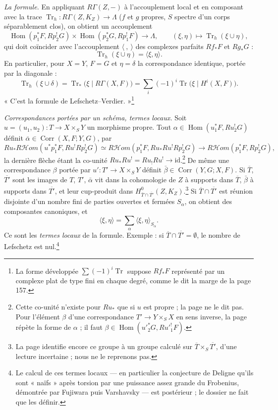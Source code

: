\documentclass[11pt,a4paper]{article}
\begin{document}
\emph{La formule.} En appliquant $R\Gamma(Z, -)$ à l'accouplement local et en
composant avec la trace $\operatorname{Tr}_{h} : R\Gamma(Z, K_{Z}) \to \Lambda$
($f$ et $g$ propres, $S$ spectre d'un corps séparablement clos), on obtient un
accouplement
\[
  \operatorname{Hom}(p_{1}^{*}F, Rp_{2}^{!}G) \times \operatorname{Hom}(p_{2}^{*}G,
  Rp_{1}^{!}F) \to \Lambda, \qquad (\xi, \eta) \mapsto
  \operatorname{Tr}_{h}(\xi \cup \eta),
\]
qui doit coïncider avec l'accouplement $\langle\ ,\ \rangle$ des complexes
parfaits $Rf_{*}F$ et $Rg_{*}G$ :
\[
  \operatorname{Tr}_{h}(\xi \cup \eta) = \langle \xi, \eta\rangle.
\]
En particulier, pour $X = Y$, $F = G$ et $\eta = \delta$ la correspondance
identique, portée par la diagonale :
\[
  \operatorname{Tr}_{h}(\xi \cup \delta) = \operatorname{Tr}_{*}\bigl(\xi \mid
  R\Gamma(X, F)\bigr) = \sum_{i}(-1)^{i}\operatorname{Tr}\bigl(\xi \mid H^{i}(X,
  F)\bigr).
\]
« C'est la formule de Lefschetz--Verdier. »\footnote{La forme développée
$\sum(-1)^{i}\operatorname{Tr}$ suppose $Rf_{*}F$ représenté par un complexe
plat de type fini en chaque degré, comme le dit la marge de la page 157.}

\emph{Correspondances portées par un schéma, termes locaux.} Soit $u = (u_{1},
u_{2}) : T \to X \times_{S} Y$ un morphisme propre. Tout $\alpha \in
\operatorname{Hom}(u_{1}^{*}F, Ru_{2}^{!}G)$ définit $\bar\alpha \in
\operatorname{Corr}(X, F; Y, G)$, par
\[
  Ru_{*}R\mathcal{H}om(u^{*}p_{1}^{*}F, Ru^{!}Rp_{2}^{!}G) \simeq
  R\mathcal{H}om(p_{1}^{*}F, Ru_{*}Ru^{!}Rp_{2}^{!}G) \to
  R\mathcal{H}om(p_{1}^{*}F, Rp_{2}^{!}G),
\]
la dernière flèche étant la co-unité $Ru_{*}Ru^{!} = Ru_{!}Ru^{!} \to
\mathrm{id}$.\footnote{Cette co-unité n'existe pour $Ru_{*}$ que si $u$ est
propre ; la page ne le dit pas. Pour l'élément $\beta$ d'une correspondance $T'
\to Y \times_{S} X$ en sens inverse, la page répète la forme de $\alpha$ ; il
faut $\beta \in \operatorname{Hom}(u'^{*}_{2}G, Ru'^{!}_{1}F)$.} De même une
correspondance $\beta$ portée par $u' : T' \to X \times_{S} Y$ définit $\bar\beta
\in \operatorname{Corr}(Y, G; X, F)$. Si $\overline{T}$, $\overline{T'}$ sont
les images de $T$, $T'$, $\bar\alpha$ vit dans la cohomologie de $Z$ à supports
dans $\overline{T}$, $\bar\beta$ à supports dans $\overline{T'}$, et leur
cup-produit dans $H^{0}_{\overline{T} \cap \overline{T'}}(Z,
K_{Z})$.\footnote{La page identifie encore ce groupe à un groupe calculé sur
$\overline{T} \times_{S} \overline{T'}$, d'une lecture incertaine ; nous ne le
reprenons pas.} Si $\overline{T} \cap \overline{T'}$ est réunion disjointe d'un
nombre fini de parties ouvertes et fermées $S_{\alpha}$, on obtient des
composantes canoniques, et
\[
  \langle \xi, \eta \rangle = \sum_{\alpha} \langle \xi, \eta
  \rangle_{S_{\alpha}} .
\]
Ce sont les \emph{termes locaux} de la formule. Exemple : si $\overline{T}
\cap \overline{T'} = \emptyset$, le nombre de Lefschetz est nul.\footnote{Le
calcul de ces termes locaux --- en particulier la conjecture de Deligne qu'ils
sont « naïfs » après torsion par une puissance assez grande du Frobenius,
démontrée par Fujiwara puis Varshavsky --- est postérieur ; le dossier ne fait
que les définir.}
\end{document}
